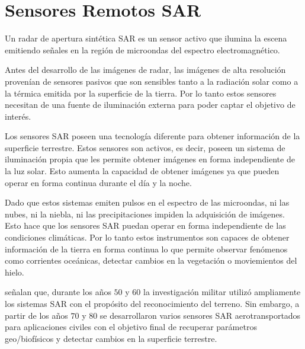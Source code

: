 

\section{Sensores Remotos SAR}


Un radar de apertura sintética SAR es un sensor activo que ilumina la escena emitiendo señales en la región de microondas del espectro electromagnético.

Antes del desarrollo de las imágenes de radar, las imágenes de alta resolución provenían de sensores pasivos que son sensibles tanto a la radiación solar como a la térmica emitida por la superficie de la tierra. Por lo tanto estos sensores necesitan de una fuente de iluminación externa para poder captar el objetivo de interés. 

Los sensores SAR poseen una tecnología diferente para obtener información de la superficie terrestre. Estos sensores son activos, es decir, poseen un sistema de iluminación propia que les permite obtener imágenes en forma independiente de la luz solar. Esto aumenta la capacidad de obtener imágenes ya que pueden operar en forma continua durante el día y la noche.

Dado que estos sistemas emiten pulsos en el espectro de las microondas, ni las nubes, ni la niebla, ni las precipitaciones impiden la adquisición de imágenes. Esto hace que los sensores SAR puedan operar en forma independiente de las condiciones climáticas. Por lo tanto estos instrumentos son capaces de obtener información de la tierra en forma continua lo que permite observar fenómenos como corrientes oceánicas, detectar cambios en la vegetación o moviemientos del hielo.


\citet{Moreira2013} señalan que, durante los años $50$ y $60$ la investigación militar utilizó ampliamente los sistemas SAR con el propósito del reconocimiento del terreno. Sin embargo, a partir de los años $70$ y $80$ se desarrollaron varios sensores SAR aerotransportados  para aplicaciones civiles con el objetivo final de recuperar parámetros geo/biofísicos y detectar cambios en la superficie terrestre.

